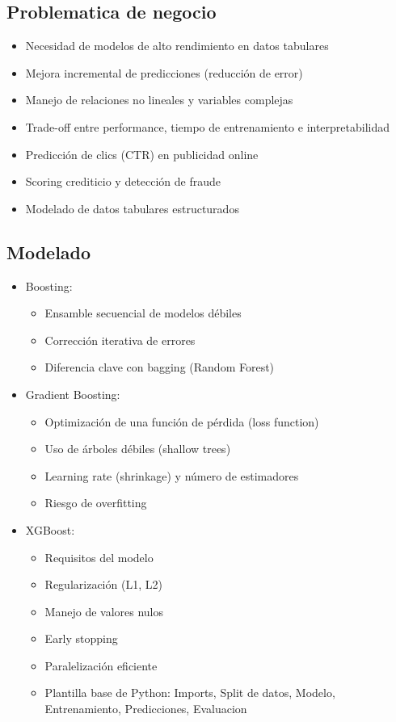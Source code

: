 \documentclass[12pt,a4paper,openany,oneside]{book}
\begin{document}
\begin{itemize}
\subsection{Problematica de negocio}
\begin{itemize}
    \item Necesidad de modelos de alto rendimiento en datos tabulares
    \item Mejora incremental de predicciones (reducción de error)
    \item Manejo de relaciones no lineales y variables complejas
    \item Trade-off entre performance, tiempo de entrenamiento e interpretabilidad
    \item Predicción de clics (CTR) en publicidad online
    \item Scoring crediticio y detección de fraude
    \item Modelado de datos tabulares estructurados
\end{itemize}

\subsection{Modelado}
\begin{itemize}
    \item Boosting:
    \begin{itemize}
        \item Ensamble secuencial de modelos débiles
        \item Corrección iterativa de errores
        \item Diferencia clave con bagging (Random Forest)
    \end{itemize}

    \item Gradient Boosting:
    \begin{itemize}
        \item Optimización de una función de pérdida (loss function)
        \item Uso de árboles débiles (shallow trees)
        \item Learning rate (shrinkage) y número de estimadores
        \item Riesgo de overfitting
    \end{itemize}

    \item XGBoost:
    \begin{itemize}
        \item Requisitos del modelo
        \item Regularización (L1, L2)
        \item Manejo de valores nulos
        \item Early stopping
        \item Paralelización eficiente
        \item Plantilla base de Python: Imports, Split de datos, Modelo, Entrenamiento, Predicciones, Evaluacion
    \end{itemize}


\end{itemize}
\end{itemize}
\end{document}

